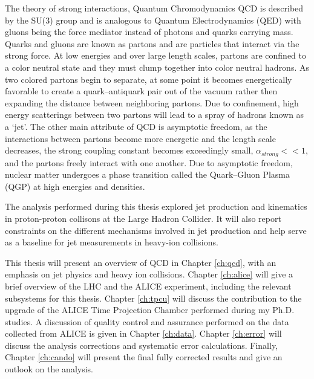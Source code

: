 \par
The theory of strong interactions, Quantum Chromodynamics QCD is described by the SU(3) group and is analogous to Quantum Electrodynamics (QED) with gluons being the force mediator instead of photons and quarks carrying mass.  Quarks and gluons are known as partons and are particles that interact via the strong force.  At low energies and over large length scales, partons are confined to a color neutral state and they must clump together into color neutral hadrons.  As two colored partons begin to separate, at some point it becomes energetically favorable to create a quark--antiquark pair out of the vacuum rather then expanding the distance between neighboring partons.  Due to confinement, high energy scatterings between two partons will lead to a spray of hadrons known as a `jet'.  The other main attribute of QCD is asymptotic freedom, as the interactions between partons become more energetic and the length scale decreases, the strong coupling constant becomes exceedingly small, $ \alpha_{strong} << 1$, and the partons freely interact with one another.  Due to asymptotic freedom, nuclear matter undergoes a phase transition called the Quark--Gluon Plasma (QGP) at high energies and densities. 

\par
The analysis performed during this thesis explored jet production and kinematics in proton-proton collisons at the Large Hadron Collider.  It will also report constraints on the different mechanisms involved in jet production and help serve as a baseline for jet measurements in heavy-ion collisions.

This thesis will present an overview of QCD in Chapter \ref{ch:qcd}, with an emphasis on jet physics and heavy ion collisions.  Chapter \ref{ch:alice} will give a brief overview of the LHC and the ALICE experiment, including the relevant subsystems for this thesis.  Chapter \ref{ch:tpcu} will discuss the contribution to the upgrade of the ALICE Time Projection Chamber performed during my Ph.D. studies.  A discussion of quality control and assurance performed on the data collected from ALICE is given in Chapter \ref{ch:data}.  Chapter \ref{ch:error} will discuss the analysis corrections and systematic error calculations.  Finally, Chapter \ref{ch:cando} will present the final fully corrected results and give an outlook on the analysis. 